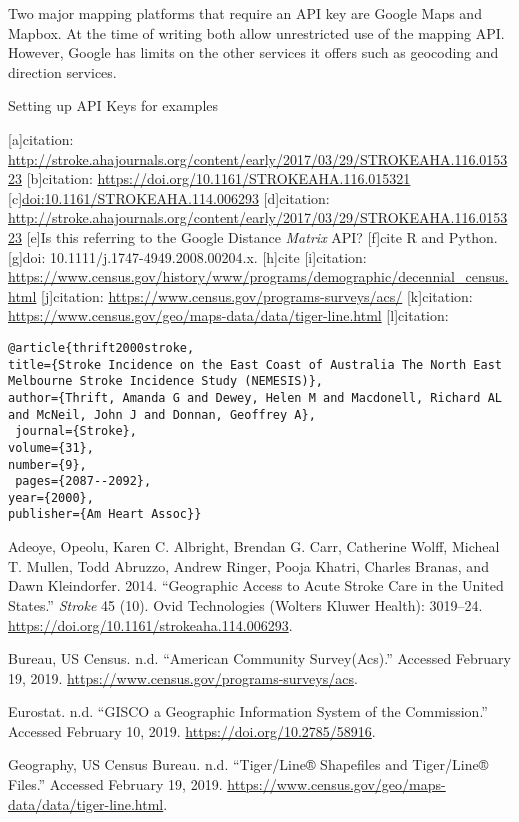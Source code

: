 \documentclass[]{article}
\begin{document}
Two major mapping platforms that require an API key are Google Maps and
Mapbox. At the time of writing both allow unrestricted use of the
mapping API. However, Google has limits on the other services it offers
such as geocoding and direction services.

Setting up API Keys for examples

{[}a{]}citation:
\url{http://stroke.ahajournals.org/content/early/2017/03/29/STROKEAHA.116.015323}
{[}b{]}citation: \url{https://doi.org/10.1161/STROKEAHA.116.015321}
{[}c{]}\url{doi:10.1161/STROKEAHA.114.006293} {[}d{]}citation:
\url{http://stroke.ahajournals.org/content/early/2017/03/29/STROKEAHA.116.015323}
{[}e{]}Is this referring to the Google Distance \emph{Matrix} API?
{[}f{]}cite R and Python. {[}g{]}doi: 10.1111/j.1747-4949.2008.00204.x.
{[}h{]}cite {[}i{]}citation:
\url{https://www.census.gov/history/www/programs/demographic/decennial_census.html}
{[}j{]}citation: \url{https://www.census.gov/programs-surveys/acs/}
{[}k{]}citation:
\url{https://www.census.gov/geo/maps-data/data/tiger-line.html}
{[}l{]}citation:

\begin{verbatim}
@article{thrift2000stroke,
title={Stroke Incidence on the East Coast of Australia The North East Melbourne Stroke Incidence Study (NEMESIS)},
author={Thrift, Amanda G and Dewey, Helen M and Macdonell, Richard AL and McNeil, John J and Donnan, Geoffrey A},
 journal={Stroke},
volume={31},
number={9},
 pages={2087--2092},
year={2000},
publisher={Am Heart Assoc}}
\end{verbatim}

\hypertarget{refs}{}
\leavevmode\hypertarget{ref-Adeoye_2014}{}%
Adeoye, Opeolu, Karen C. Albright, Brendan G. Carr, Catherine Wolff,
Micheal T. Mullen, Todd Abruzzo, Andrew Ringer, Pooja Khatri, Charles
Branas, and Dawn Kleindorfer. 2014. ``Geographic Access to Acute Stroke
Care in the United States.'' \emph{Stroke} 45 (10). Ovid Technologies
(Wolters Kluwer Health): 3019--24.
\url{https://doi.org/10.1161/strokeaha.114.006293}.

\leavevmode\hypertarget{ref-us_census_bureau_acs}{}%
Bureau, US Census. n.d. ``American Community Survey(Acs).'' Accessed
February 19, 2019. \url{https://www.census.gov/programs-surveys/acs}.

\leavevmode\hypertarget{ref-eurostat}{}%
Eurostat. n.d. ``GISCO a Geographic Information System of the
Commission.'' Accessed February 10, 2019.
\url{https://doi.org/10.2785/58916}.

\leavevmode\hypertarget{ref-us_census_tiger_line}{}%
Geography, US Census Bureau. n.d. ``Tiger/Line® Shapefiles and
Tiger/Line® Files.'' Accessed February 19, 2019.
\url{https://www.census.gov/geo/maps-data/data/tiger-line.html}.
\end{document}
